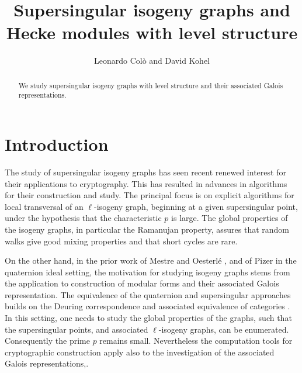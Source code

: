 \documentclass{amsart}
\makeatletter
\newcommand{\reqnomode}{\tagsleft@false\let\veqno\@@eqno}
\makeatother
\begin{document}
\title{Supersingular isogeny graphs and Hecke modules with level structure}
\author{Leonardo Col\`o and David Kohel}
\date{}
\reqnomode

\begin{abstract}
  We study supersingular isogeny graphs with level structure and their associated
  Galois representations.
\end{abstract}

\maketitle

\section{Introduction}

The study of supersingular isogeny graphs has seen recent renewed interest
for their applications to cryptography.  This has resulted in advances in
algorithms for their construction and study.  The principal focus is on
explicit algorithms for local transversal of an $\ell$-isogeny graph,
beginning at a given supersingular point, under the hypothesis that the
characteristic $p$ is large.  The global properties of the isogeny
graphs, in particular the Ramanujan property, assures that random walks
give good mixing properties and that short cycles are rare.

On the other hand, in the prior work of Mestre and Oesterl\'e \cite{Mestre86},
and of Pizer \cite{Pizer80} in the quaternion ideal setting, the motivation
for studying isogeny graphs stems from the application to construction of
modular forms and their associated Galois representation.  The equivalence
of the quaternion and supersingular approaches builds on the Deuring
correspondence \cite{Deuring} and associated equivalence of categories
\cite{Kohel96}.  In this setting, one needs to study the global properties
of the graphs, such that the supersingular points, and associated $\ell$-isogeny
graphs, can be enumerated.  Consequently the prime $p$ remains small.
Nevertheless the computation tools for cryptographic construction apply
also to the investigation of the associated Galois representations,.
\end{document}
